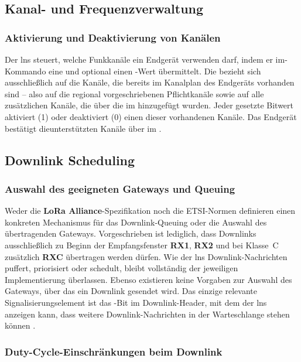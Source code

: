 \subsection{Kanal- und Frequenzverwaltung}

\subsubsection{Aktivierung und Deaktivierung von Kanälen}

Der \ac{lns} steuert, welche Funkkanäle ein Endgerät verwenden darf, indem er im-Kommando eine  und optional einen -Wert übermittelt. Die  bezieht sich ausschlie{\ss}lich auf die Kanäle, die bereits im Kanalplan des Endgeräts vorhanden sind – also auf die regional vorgeschriebenen Pflichtkanäle sowie auf alle zusätzlichen Kanäle, die über die  im hinzugefügt wurden. Jeder gesetzte Bitwert aktiviert (1) oder deaktiviert (0) einen dieser vorhandenen Kanäle. Das Endgerät bestätigt dieunterstützten Kanäle über  im . 

\subsection{Downlink Scheduling}

\subsubsection{Auswahl des geeigneten Gateways und Queuing}

Weder die \textbf{LoRa Alliance}-Spezifikation noch die ETSI-Normen definieren einen konkreten Mechanismus für das Downlink-Queuing oder die Auswahl des übertragenden Gateways. Vorgeschrieben ist lediglich, dass Downlinks ausschlie{\ss}lich zu Beginn der Empfangsfenster \textbf{RX1}, \textbf{RX2} und bei Klasse~C zusätzlich \textbf{RXC} übertragen werden dürfen. Wie der \ac{lns} Downlink-Nachrichten puffert, priorisiert oder schedult, bleibt vollständig der jeweiligen Implementierung überlassen. Ebenso existieren keine Vorgaben zur Auswahl des Gateways, über das ein Downlink gesendet wird. Das einzige relevante Signalisierungselement ist das -Bit im Downlink-Header, mit dem der \ac{lns} anzeigen kann, dass weitere Downlink-Nachrichten in der Warteschlange stehen können \cite{LoRaAlliance:2020b}.

\subsubsection{Duty-Cycle-Einschränkungen beim Downlink}

